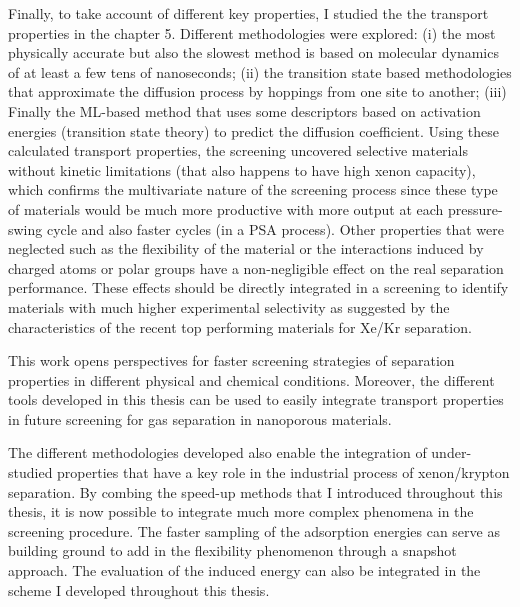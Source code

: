 Finally, to take account of different key properties, I studied the the transport properties in the chapter 5. Different methodologies were explored: (i) the most physically accurate but also the slowest method is based on molecular dynamics of at least a few tens of nanoseconds; (ii) the transition state based methodologies that approximate the diffusion process by hoppings from one site to another; (iii) Finally the ML-based method that uses some descriptors based on activation energies (transition state theory) to predict the diffusion coefficient. Using these calculated transport properties, the screening uncovered selective materials without kinetic limitations (that also happens to have high xenon capacity), which confirms the multivariate nature of the screening process since these type of materials would be much more productive with more output at each pressure-swing cycle and also faster cycles (in a PSA process). Other properties that were neglected such as the flexibility of the material or the interactions induced by charged atoms or polar groups have a non-negligible effect on the real separation performance. These effects should be directly integrated in a screening to identify materials with much higher experimental selectivity as suggested by the characteristics of the recent top performing materials for Xe/Kr separation.\autocite{Li_2019,Pei_2022} 

 
\begin{center}
\end{center}


This work opens perspectives for faster screening strategies of separation properties in different physical and chemical conditions. Moreover, the different tools developed in this thesis can be used to easily integrate transport properties in future screening for gas separation in nanoporous materials.

The different methodologies developed also enable the integration of under-studied properties that have a key role in the industrial process of xenon/krypton separation. By combing the speed-up methods that I introduced throughout this thesis, it is now possible to integrate much more complex phenomena in the screening procedure. The faster sampling of the adsorption energies can serve as building ground to add in the flexibility phenomenon through a snapshot approach\autocite{Witman_2017}. The evaluation of the induced energy\autocite{Lachet_1998} can also be integrated in the scheme I developed throughout this thesis. 



\vfill
\begin{center}
\end{center}
\vfill\vfill
